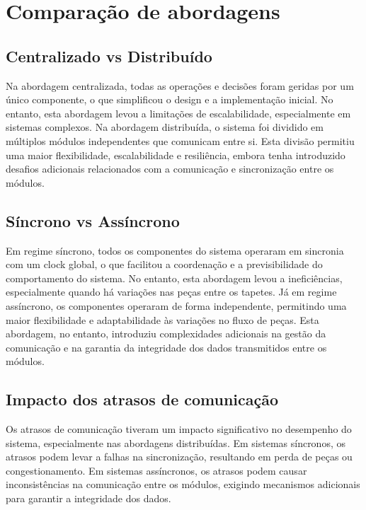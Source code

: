 \section{Comparação de abordagens}

\subsection{Centralizado vs Distribuído}
Na abordagem centralizada, todas as operações e decisões foram geridas por um único componente, o que simplificou o design e a implementação inicial. No entanto, esta abordagem levou a limitações de escalabilidade, especialmente em sistemas complexos.
Na abordagem distribuída, o sistema foi dividido em múltiplos módulos independentes que comunicam entre si. Esta divisão permitiu uma maior flexibilidade, escalabilidade e resiliência, embora tenha introduzido desafios adicionais relacionados com a comunicação e sincronização entre os módulos.
\subsection{Síncrono vs Assíncrono}
Em regime síncrono, todos os componentes do sistema operaram em sincronia com um clock global, o que facilitou a coordenação e a previsibilidade do comportamento do sistema. No entanto, esta abordagem levou a ineficiências, especialmente quando há variações nas peças entre os tapetes.
Já em regime assíncrono, os componentes operaram de forma independente, permitindo uma maior flexibilidade e adaptabilidade às variações no fluxo de peças. Esta abordagem, no entanto, introduziu complexidades adicionais na gestão da comunicação e na garantia da integridade dos dados transmitidos entre os módulos.
\subsection{Impacto dos atrasos de comunicação} 
Os atrasos de comunicação tiveram um impacto significativo no desempenho do sistema, especialmente nas abordagens distribuídas. Em sistemas síncronos, os atrasos podem levar a falhas na sincronização, resultando em perda de peças ou congestionamento. Em sistemas assíncronos, os atrasos podem causar inconsistências na comunicação entre os módulos, exigindo mecanismos adicionais para garantir a integridade dos dados.

